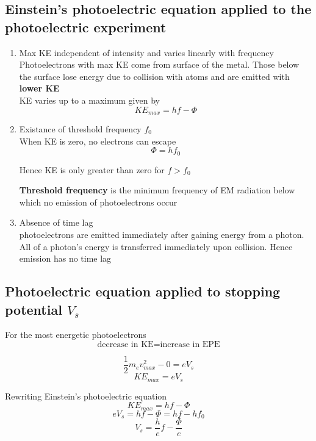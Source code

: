 \documentclass[a4paper, 10pt]{article}
\begin{document}
\subsection{Einstein's photoelectric equation applied to the photoelectric experiment}
\begin{enumerate}
   \item Max KE independent of intensity and varies linearly with frequency \\

      Photoelectrons with max KE come from surface of the metal. Those below the surface lose energy due to collision with atoms and are emitted with \textbf{lower KE} \\

      KE varies up to a maximum given by
      \[
         KE_{max} = hf - \Phi
      \]
   \item Existance of threshold frequency $f_0$ \\

     When KE is zero, no electrons can escape
     \[
     \Phi = hf_0
     \]

     Hence KE is only greater than zero for $f > f_0$ 
     \begin{framed}
        \textbf{Threshold frequency} is the minimum frequency of EM radiation below which no emission of photoelectrons occur
     \end{framed}	


  \item Absence of time lag \\

     photoelectrons are emitted immediately after gaining energy from a photon. All of a photon's energy is transferred immediately upon collision. Hence emission has no time lag
      
\end{enumerate}	

\subsection{Photoelectric equation applied to stopping potential $V_s$}

For the most energetic photoelectrons
\[
   \text{decrease in KE} = \text{increase in EPE}
\]

\[
   \frac{1}{2}m_e v_{max}^2 - 0 = eV_s
\]
\[
   KE_{max} = eV_s
\]

Rewriting Einstein's photoelectric equation
\[
   KE_{max} = hf - \Phi
\]
\[
eV_s = hf - \Phi = hf - hf_0
\]
\[
   V_s = \frac{h}{e}f - \frac{\Phi}{e}
\]
\end{document}
